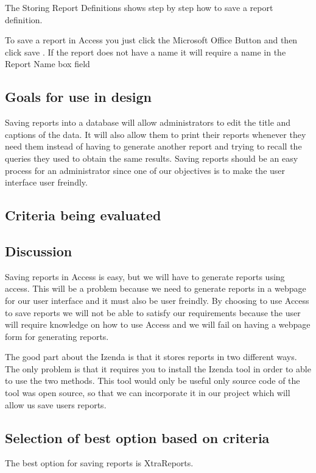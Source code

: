 \documentclass[12pt, draftclsnofoot, onecolumn]{IEEEtran}
\begin{document}
The Storing Report Definitions shows step by step how to save a report definition. 

To save a report in Access you just click the Microsoft Office Button and then click save \cite{SimpleReport}. If the report does not have a name it will require a name in the Report Name box field \cite{SimpleReport}

\subsection{Goals for use in design}
Saving reports into a database will allow administrators to edit the title and captions of the data. It will also allow them to print their reports whenever they need them instead of having to generate another report and trying to recall the queries they used to obtain the same results. Saving reports should be an easy process for an administrator since one of our objectives is to make the user interface user freindly. 
\subsection{Criteria being evaluated}

\subsection{Discussion}
Saving reports in Access is easy, but we will have to generate reports using access. This will be a problem because we need to generate reports in a webpage for our user interface and it must also be user freindly. By choosing to use Access to save reports we will not be able to satisfy our requirements because the user will require knowledge on how to use Access and we will fail on having a webpage form for generating reports. 

The good part about the Izenda is that it stores reports in two different ways. The only problem is that it requires you to install the Izenda tool in order to able to use the two methods. This tool would only be useful only source code of the tool was open source, so that we can incorporate it in our project which will allow us  save users reports. 


\subsection{Selection of best option based on criteria} 
The best option for saving reports is XtraReports. 
\end{document}
